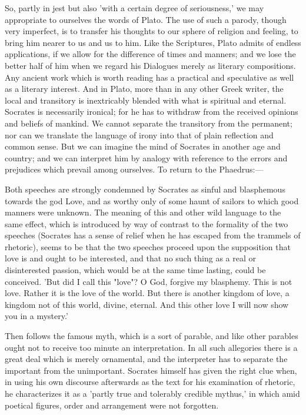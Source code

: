 \documentclass[11pt,letter]{article}
\begin{document}
\par  So, partly in jest but also 'with a certain degree of seriousness,' we may appropriate to ourselves the words of Plato. The use of such a parody, though very imperfect, is to transfer his thoughts to our sphere of religion and feeling, to bring him nearer to us and us to him. Like the Scriptures, Plato admits of endless applications, if we allow for the difference of times and manners; and we lose the better half of him when we regard his Dialogues merely as literary compositions. Any ancient work which is worth reading has a practical and speculative as well as a literary interest. And in Plato, more than in any other Greek writer, the local and transitory is inextricably blended with what is spiritual and eternal. Socrates is necessarily ironical; for he has to withdraw from the received opinions and beliefs of mankind. We cannot separate the transitory from the permanent; nor can we translate the language of irony into that of plain reflection and common sense. But we can imagine the mind of Socrates in another age and country; and we can interpret him by analogy with reference to the errors and prejudices which prevail among ourselves. To return to the Phaedrus:—

\par  Both speeches are strongly condemned by Socrates as sinful and blasphemous towards the god Love, and as worthy only of some haunt of sailors to which good manners were unknown. The meaning of this and other wild language to the same effect, which is introduced by way of contrast to the formality of the two speeches (Socrates has a sense of relief when he has escaped from the trammels of rhetoric), seems to be that the two speeches proceed upon the supposition that love is and ought to be interested, and that no such thing as a real or disinterested passion, which would be at the same time lasting, could be conceived. 'But did I call this "love"? O God, forgive my blasphemy. This is not love. Rather it is the love of the world. But there is another kingdom of love, a kingdom not of this world, divine, eternal. And this other love I will now show you in a mystery.'

\par  Then follows the famous myth, which is a sort of parable, and like other parables ought not to receive too minute an interpretation. In all such allegories there is a great deal which is merely ornamental, and the interpreter has to separate the important from the unimportant. Socrates himself has given the right clue when, in using his own discourse afterwards as the text for his examination of rhetoric, he characterizes it as a 'partly true and tolerably credible mythus,' in which amid poetical figures, order and arrangement were not forgotten.
\end{document}
